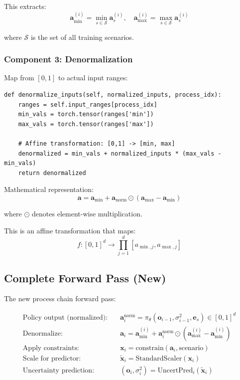 \documentclass[11pt,a4paper]{article}
\begin{document}
This extracts:
\begin{equation}
\mathbf{a}_{\min}^{(i)} = \min_{s \in \mathcal{S}} \mathbf{a}_s^{(i)}, \quad
\mathbf{a}_{\max}^{(i)} = \max_{s \in \mathcal{S}} \mathbf{a}_s^{(i)}
\end{equation}

where $\mathcal{S}$ is the set of all training scenarios.

\subsubsection{Component 3: Denormalization}

Map from $[0,1]$ to actual input ranges:

\begin{lstlisting}[caption={Denormalization method}]
def denormalize_inputs(self, normalized_inputs, process_idx):
    ranges = self.input_ranges[process_idx]
    min_vals = torch.tensor(ranges['min'])
    max_vals = torch.tensor(ranges['max'])

    # Affine transformation: [0,1] -> [min, max]
    denormalized = min_vals + normalized_inputs * (max_vals - min_vals)
    return denormalized
\end{lstlisting}

Mathematical representation:
\begin{equation}
\mathbf{a} = \mathbf{a}_{\min} + \mathbf{a}_{\text{norm}} \odot (\mathbf{a}_{\max} - \mathbf{a}_{\min})
\end{equation}

where $\odot$ denotes element-wise multiplication.

This is an affine transformation that maps:
\begin{equation}
f: [0,1]^d \to \prod_{j=1}^d [a_{\min,j}, a_{\max,j}]
\end{equation}

\subsection{Complete Forward Pass (New)}

The new process chain forward pass:

\begin{align}
\text{Policy output (normalized):} \quad &\mathbf{a}_i^{\text{norm}} = \pi_\theta(\mathbf{o}_{i-1}, \sigma^2_{i-1}, \mathbf{e}_s) \in [0,1]^d \\
\text{Denormalize:} \quad &\mathbf{a}_i = \mathbf{a}_{\min}^{(i)} + \mathbf{a}_i^{\text{norm}} \odot (\mathbf{a}_{\max}^{(i)} - \mathbf{a}_{\min}^{(i)}) \\
\text{Apply constraints:} \quad &\mathbf{x}_i = \text{constrain}(\mathbf{a}_i, \text{scenario}) \\
\text{Scale for predictor:} \quad &\tilde{\mathbf{x}}_i = \text{StandardScaler}(\mathbf{x}_i) \\
\text{Uncertainty prediction:} \quad &(\mathbf{o}_i, \sigma^2_i) = \text{UncertPred}_i(\tilde{\mathbf{x}}_i)
\end{align}
\end{document}
